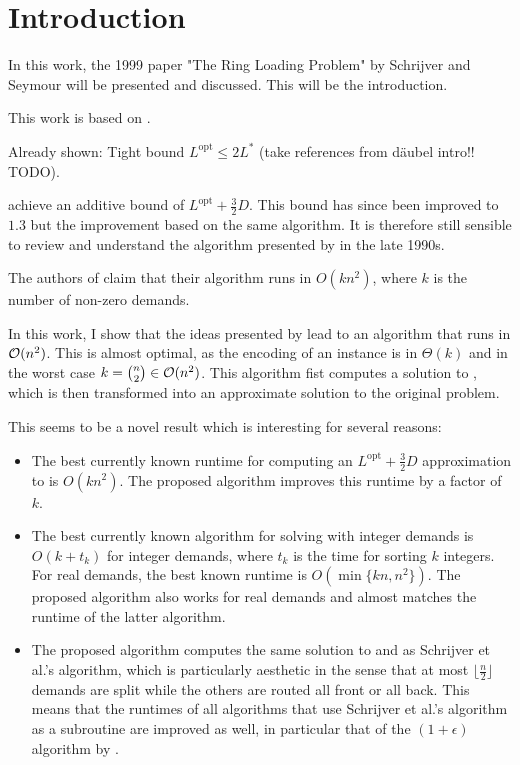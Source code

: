 \section{Introduction}

In this work, the 1999 paper "The Ring Loading Problem" by Schrijver and Seymour will be presented and discussed.
This will be the introduction.

This work is based on \citet{schrijver99}.

Already shown: Tight bound $L^\mathrm{opt} \leq 2 L^\ast$ (take references from däubel intro!! TODO).

\citet{schrijver99} achieve an additive bound of $L^\mathrm{opt} + \frac{3}{2}D$.
This bound has since been improved to $1.3$ but the improvement based on the same algorithm.
It is therefore still sensible to review and understand the algorithm presented by \citet{schrijver99} in the late 1990s.

The authors of \cite{schrijver99} claim that their algorithm runs in $O(k n^2)$, where $k$ is the number of non-zero demands.

In this work, I show that the ideas presented by \citet{schrijver99} lead to an algorithm that runs in $\mathcal{O}(n^2)$.
This is almost optimal, as the encoding of an instance is in $\Theta(k)$ and in the worst case $k = \binom{n}{2} \in \mathcal{O}(n^2)$.
This algorithm fist computes a solution to \RRL, which is then transformed into an approximate solution to the original \RL problem.

This seems to be a novel result which is interesting for several reasons:
\begin{itemize}
	\item The best currently known runtime for computing an $L^\mathrm{opt} + \frac{3}{2}D$ approximation to \RL is $O(k n^2)$.
	The proposed algorithm improves this runtime by a factor of $k$.
	\item The best currently known algorithm for solving \RRL with integer demands is $O(k + t_k)$ for integer demands, where $t_k$ is the time for sorting $k$ integers.
	For real demands, the best known runtime is $O(\min\{kn, n^2\})$.
	The proposed algorithm also works for real demands and almost matches the runtime of the latter algorithm.
	\item The proposed algorithm computes the same solution to \RL and \RRL as Schrijver et al.'s algorithm, which is particularly aesthetic in the sense that at most $\lfloor\frac{n}{2}\rfloor$ demands are split while the others are routed all front or all back.
	This means that the runtimes of all algorithms that use Schrijver et al.'s algorithm as a subroutine are improved as well, in particular that of the $(1 + \epsilon)$ algorithm by \citet{khanna97}.
\end{itemize}
